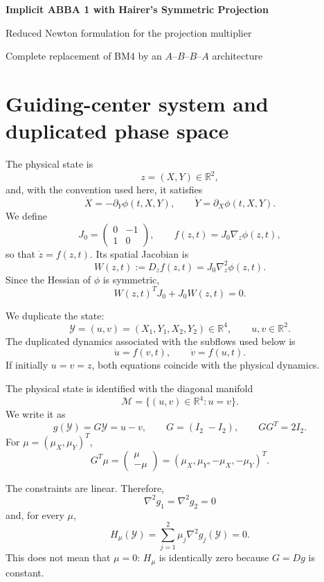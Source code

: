 \documentclass[11pt,a4paper]{article}
\newcommand{\R}{\mathbb{R}}
\newcommand{\Id}{I}
\newcommand{\Y}{\mathcal{Y}}
\newcommand{\M}{\mathcal{M}}
\begin{document}
\begin{center}
  {\LARGE\bfseries\color{blue}Implicit ABBA 1 with Hairer's Symmetric Projection}\par
  \vspace{0.35em}
  {\large Reduced Newton formulation for the projection multiplier}\par
  \vspace{0.45em}
  {\small Complete replacement of BM4 by an $A$--$B$--$B$--$A$ architecture}
\end{center}

\vspace{0.5em}

\section{Guiding-center system and duplicated phase space}

The physical state is
\[
 z=(X,Y)\in\R^2,
\]
and, with the convention used here, it satisfies
\[
 \dot X=-\partial_Y\phi(t,X,Y),
 \qquad
 \dot Y=\partial_X\phi(t,X,Y).
\]
We define
\[
 J_0=
 \begin{pmatrix}
  0&-1\\
  1&0
 \end{pmatrix},
 \qquad
 f(z,t)=J_0\nabla_z\phi(z,t),
\]
so that $\dot z=f(z,t)$. Its spatial Jacobian is
\[
 W(z,t):=D_zf(z,t)=J_0\nabla_z^2\phi(z,t).
\]
Since the Hessian of $\phi$ is symmetric,
\[
 W(z,t)^TJ_0+J_0W(z,t)=0. \tag{1}
\]

We duplicate the state:
\[
 \Y=(u,v)=(X_1,Y_1,X_2,Y_2)\in\R^4,
 \qquad u,v\in\R^2.
\]
The duplicated dynamics associated with the subflows used below is
\[
 \dot u=f(v,t),
 \qquad
 \dot v=f(u,t).
\]
If initially $u=v=z$, both equations coincide with the physical dynamics.

The physical state is identified with the diagonal manifold
\[
 \M=\{(u,v)\in\R^4:u=v\}.
\]
We write it as
\[
 g(\Y)=G\Y=u-v,
 \qquad
 G=(\Id_2\; -\Id_2),
 \qquad
 GG^T=2\Id_2.
\]
For $\mu=(\mu_X,\mu_Y)^T$,
\[
 G^T\mu=
 \begin{pmatrix}\mu\\-\mu\end{pmatrix}
 =(\mu_X,\mu_Y,-\mu_X,-\mu_Y)^T.
\]

The constraints are linear. Therefore,
\[
 \nabla^2g_1=\nabla^2g_2=0
\]
and, for every $\mu$,
\[
 \boxed{
 H_\mu(\Y)=\sum_{j=1}^2\mu_j\nabla^2g_j(\Y)=0.
 }
\]
This does not mean that $\mu=0$: $H_\mu$ is identically zero because $G=Dg$ is constant.
\end{document}
